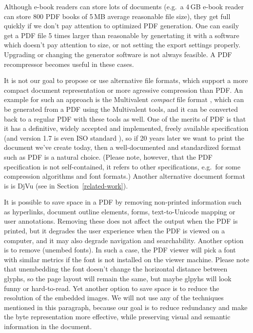 \documentclass{ltugproc}
\begin{document}
Although e-book readers can store lots of documents (e.g.\ a 4\,GB e-book
reader can store 800 PDF books of 5\,MB average reasonable file size), they
get full quickly if we don't pay attention to optimized PDF generation. One
can easily get a PDF file 5 times larger than reasonable by genertating it
with a software which doesn't pay attention to size,
or not setting the export settings
properly. Upgrading or changing the generator software is not always
feasible. A PDF recompressor becomes useful in these cases.

It is not our goal to propose or use
alternative file formats, which support a more
compact document representation or more agressive compression than PDF. An
example for such an approach is the Multivalent \emph{compact} file format
\cite{multivalent-compact}, which can be generated from a PDF using the
Multivalent tools, and it can be converted back to a regular PDF with these
tools as well. One of the merits of PDF is that it has a definitive, widely
accepted and implemented, freely available
specification \cite{pdfref} (and version 1.7 is
even ISO standard \cite{pdf-iso}), so if 20 years later we want to
print the document we've create today, then a well-documented and
standardized format such as PDF is a natural choice. (Please note, however,
that the PDF specification is not self-contained, it refers to other
specifications, e.g.\ for some compression algorithms and font formats.)
Another alternative document format is is DjVu (see in
Section~\ref{related-work}).

It is possible to save space in a PDF by removing non-printed information
such as hyperlinks, document outline elements, forms, text-to-Unicode
mapping or user annotations. Removing these does not affect the output when
the PDF is printed, but it degrades the user experience when the PDF is
viewed on a computer, and it may also degrade navigation and searchability.
Another option is to remove (unembed fonts). In such a case, the PDF viewer
will pick a font with similar metrics if the font is not installed on the
viewer machine. Please note that unembedding the font doesn't change the
horizontal distance between glyphs, so the page layout will remain the
same, but maybe glpyhs will look funny or hard-to-read. Yet another option
to save space is to reduce the resolution of the embedded images. We will
not use any of the techniques mentioned in this paragraph, because our goal
is to reduce redundancy and make the byte representation more effective,
while preserving visual and semantic information in the document.
\end{document}

